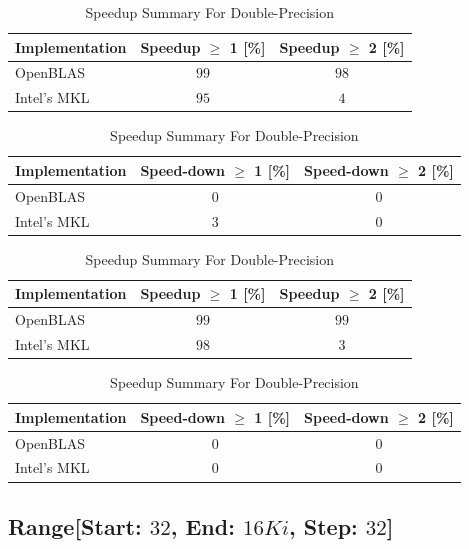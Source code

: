 \begin{table}[ht]
    \centering
    \caption{Speedup Summary For Single-Precision}
    \begin{tabular}{|l|c|c|}
        \hline
        \textbf{Implementation} & \textbf{Speedup $\geq$ 1 [\%]} & \textbf{Speedup $\geq$ 2 [\%]}\\
        \hline
        OpenBLAS    & $99$ & $98$ \\
        \hline
        Intel's MKL & $95$ & $4$ \\
        \hline
    \end{tabular}
    
    \begin{tabular}{|l|c|c|}
        \hline
        \textbf{Implementation} & \textbf{Speed-down $\geq$ 1 [\%]} & \textbf{Speed-down $\geq$ 2 [\%]}\\
        \hline
        OpenBLAS    & $0$ & $0$ \\
        \hline
        Intel's MKL & $3$ & $0$ \\
        \hline
    \end{tabular}
    
    \vspace*{1 cm}

    \centering
    \caption{Speedup Summary For Double-Precision}
    \begin{tabular}{|l|c|c|}
        \hline
        \textbf{Implementation} & \textbf{Speedup $\geq$ 1 [\%]} & \textbf{Speedup $\geq$ 2 [\%]}\\
        \hline
        OpenBLAS    & $99$ & $99$ \\
        \hline
        Intel's MKL & $98$ & $3$ \\
        \hline
    \end{tabular}
    
    \begin{tabular}{|l|c|c|}
        \hline
        \textbf{Implementation} & \textbf{Speed-down $\geq$ 1 [\%]} & \textbf{Speed-down $\geq$ 2 [\%]}\\
        \hline
        OpenBLAS    & $0$ & $0$ \\
        \hline
        Intel's MKL & $0$ & $0$ \\
        \hline
    \end{tabular}
\end{table}


\clearpage
\subsection*{Range[Start: $32$, End: $16Ki$, Step: $32$]}

